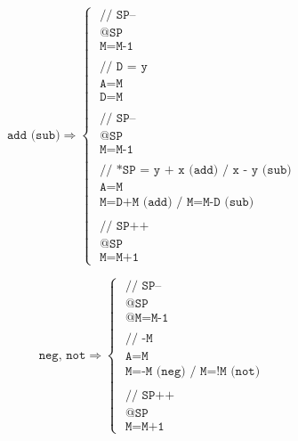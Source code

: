 \documentclass[a4paper]{book}
\begin{document}
\[
    \texttt{add (sub)}
    \Rightarrow
    \begin{cases}
        \texttt{ // SP--                            } \\
        \texttt{ @SP                                } \\
        \texttt{ M=M-1                              } \\
        \\
        \texttt{ // D = y                           } \\
        \texttt{ A=M                                } \\
        \texttt{ D=M                                } \\
        \\
        \texttt{ // SP--                            } \\
        \texttt{ @SP                                } \\
        \texttt{ M=M-1                              } \\
        \\
        \texttt{ // *SP = y + x (add) / x - y (sub) } \\
        \texttt{ A=M                                } \\
        \texttt{ M=D+M (add) / M=M-D (sub)          } \\
        \\
        \texttt{ // SP++                            } \\
        \texttt{ @SP                                } \\
        \texttt{ M=M+1                              }
    \end{cases}
\]

\[
    \texttt{neg, not}
    \Rightarrow
    \begin{cases}
        \texttt{ // SP--                 } \\
        \texttt{ @SP                     } \\
        \texttt{ @M=M-1                  } \\
        \\
        \texttt{ // -M                   } \\
        \texttt{ A=M                     } \\
        \texttt{ M=-M (neg) / M=!M (not) } \\
        \\
        \texttt{ // SP++                 } \\
        \texttt{ @SP                     } \\
        \texttt{ M=M+1                   }
    \end{cases}
\]
\end{document}
